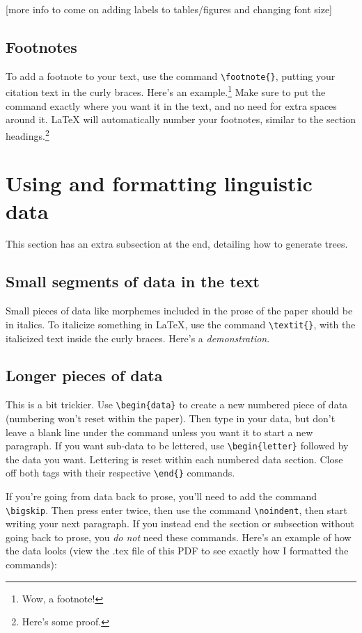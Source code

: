 \documentclass[12pt]{article}
\newcounter{data}
\newenvironment{data}{%
	\refstepcounter{data}%
	\setcounter{letter}{0}%
	\bigskip\par\noindent%
	\makebox[0.5in][l]{(\thedata)}%
	\ignorespaces%
}{%
	\ignorespacesafterend%
}
\newcounter{letter}
\newenvironment{letter}{%
	\refstepcounter{letter}%
	\makebox[0.5in][l]{\alph{letter}.}%
	\ignorespaces%
}{%
	\ignorespacesafterend%
}
\begin{document}
	[more info to come on adding labels to tables/figures and changing font size]
	
	\subsection{Footnotes}
	To add a footnote to your text, use the command \verb|\footnote{}|, putting your citation text in the curly braces. Here's an example.\footnote{Wow, a footnote!} Make sure to put the command exactly where you want it in the text, and no need for extra spaces around it. LaTeX will automatically number your footnotes, similar to the section headings.\footnote{Here's some proof.}
	
	\section{Using and formatting linguistic data}
	This section has an extra subsection at the end, detailing how to generate trees.
	
	\subsection{Small segments of data in the text}
	Small pieces of data like morphemes included in the prose of the paper should be in italics. To italicize something in LaTeX, use the command \verb|\textit{}|, with the italicized text inside the curly braces. Here's a \textit{demonstration}.
	
	\subsection{Longer pieces of data}
	This is a bit trickier. Use \verb|\begin{data}| to create a new numbered piece of data (numbering won't reset within the paper). Then type in your data, but don't leave a blank line under the command unless you want it to start a new paragraph. If you want sub-data to be lettered, use \verb|\begin{letter}| followed by the data you want. Lettering is reset within each numbered data section. Close off both tags with their respective \verb|\end{}| commands. 
	
	If you're going from data back to prose, you'll need to add the command \verb|\bigskip|. Then press enter twice, then use the command \verb|\noindent|, then start writing your next paragraph. If you instead end the section or subsection without going back to prose, you \textit{do not} need these commands. Here's an example of how the data looks (view the .tex file of this PDF to see exactly how I formatted the commands):
	
\end{document}
